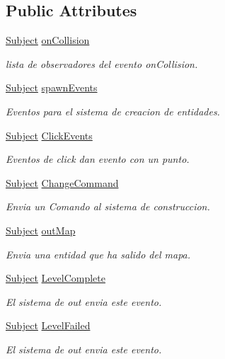 \subsection*{Public Attributes}
\begin{DoxyCompactItemize}
\item 
\hyperlink{classant_1_1_subject}{Subject} \hyperlink{classant_1_1_game_event_dispatcher_a610093857ac94ea9c91d8896928424c4}{on\+Collision}
\begin{DoxyCompactList}\small\item\em lista de observadores del evento on\+Collision. \end{DoxyCompactList}\item 
\hyperlink{classant_1_1_subject}{Subject} \hyperlink{classant_1_1_game_event_dispatcher_a18ce79039513ba4a440bf0f16862932b}{spawn\+Events}
\begin{DoxyCompactList}\small\item\em Eventos para el sistema de creacion de entidades. \end{DoxyCompactList}\item 
\hyperlink{classant_1_1_subject}{Subject} \hyperlink{classant_1_1_game_event_dispatcher_ac3aff44451719b319fbdd9cbba0e9e96}{Click\+Events}
\begin{DoxyCompactList}\small\item\em Eventos de click dan evento con un punto. \end{DoxyCompactList}\item 
\hyperlink{classant_1_1_subject}{Subject} \hyperlink{classant_1_1_game_event_dispatcher_a4ad76b52e706a61ca46d274b9fb50269}{Change\+Command}
\begin{DoxyCompactList}\small\item\em Envia un Comando al sistema de construccion. \end{DoxyCompactList}\item 
\hyperlink{classant_1_1_subject}{Subject} \hyperlink{classant_1_1_game_event_dispatcher_a109269d2769c69e6ffdd83ac777c8e56}{out\+Map}
\begin{DoxyCompactList}\small\item\em Envia una entidad que ha salido del mapa. \end{DoxyCompactList}\item 
\hyperlink{classant_1_1_subject}{Subject} \hyperlink{classant_1_1_game_event_dispatcher_a0ea1a629f7efdd3f7002530c6148c7e3}{Level\+Complete}
\begin{DoxyCompactList}\small\item\em El sistema de out envia este evento. \end{DoxyCompactList}\item 
\hyperlink{classant_1_1_subject}{Subject} \hyperlink{classant_1_1_game_event_dispatcher_a0a9bbdc52262860271909d1461e7b451}{Level\+Failed}
\begin{DoxyCompactList}\small\item\em El sistema de out envia este evento. \end{DoxyCompactList}\end{DoxyCompactItemize}


